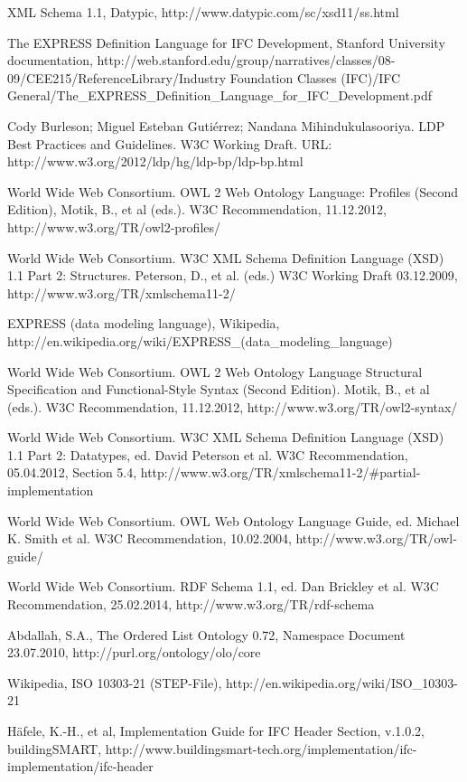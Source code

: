 %
%


\begin{thebibliography}{}

XML Schema 1.1, Datypic, http://www.datypic.com/sc/xsd11/ss.html

The EXPRESS Definition Language for IFC Development, Stanford University documentation,
http://web.stanford.edu/group/narratives/classes/08-09/CEE215/ReferenceLibrary/Industry Foundation Classes (IFC)/IFC General/The\_EXPRESS\_Definition\_Language\_for\_IFC\_Development.pdf

Cody Burleson; Miguel Esteban Gutiérrez; Nandana Mihindukulasooriya. LDP Best Practices and Guidelines. W3C Working Draft. URL: http://www.w3.org/2012/ldp/hg/ldp-bp/ldp-bp.html

World Wide Web Consortium. OWL 2 Web Ontology Language: Profiles (Second Edition), Motik, B., et al (eds.). W3C Recommendation, 11.12.2012, http://www.w3.org/TR/owl2-profiles/

World Wide Web Consortium. W3C XML Schema Definition Language (XSD) 1.1 Part 2: Structures.  Peterson, D., et al. (eds.) W3C Working Draft 03.12.2009, http://www.w3.org/TR/xmlschema11-2/

EXPRESS (data modeling language), Wikipedia, http://en.wikipedia.org/wiki/EXPRESS\_(data\_modeling\_language)

World Wide Web Consortium. OWL 2 Web Ontology Language 
Structural Specification and Functional-Style Syntax (Second Edition). Motik, B., et al (eds.). W3C Recommendation, 11.12.2012, http://www.w3.org/TR/owl2-syntax/

World Wide Web Consortium. W3C XML Schema Definition Language (XSD) 1.1 Part 2: Datatypes, ed. David Peterson et al. W3C Recommendation, 05.04.2012, Section 5.4, http://www.w3.org/TR/xmlschema11-2/\#partial-implementation 

World Wide Web Consortium. OWL Web Ontology Language Guide, ed. Michael K. Smith et al. W3C Recommendation, 10.02.2004, http://www.w3.org/TR/owl-guide/

World Wide Web Consortium. RDF Schema 1.1, ed. Dan Brickley et al. W3C Recommendation, 25.02.2014, http://www.w3.org/TR/rdf-schema

Abdallah, S.A., The Ordered List Ontology 0.72, Namespace Document 23.07.2010, http://purl.org/ontology/olo/core

Wikipedia, ISO 10303-21 (STEP-File), http://en.wikipedia.org/wiki/ISO\_10303-21

H\"afele, K.-H., et al, Implementation Guide for IFC Header Section, v.1.0.2, buildingSMART, http://www.buildingsmart-tech.org/implementation/ifc-implementation/ifc-header

\end{thebibliography}
